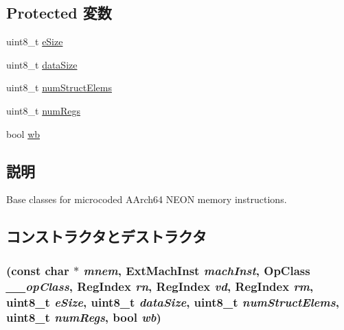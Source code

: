 \subsection*{Protected 変数}
\begin{DoxyCompactItemize}
\item 
uint8\_\-t \hyperlink{classArmISA_1_1VldMultOp64_aac129ded07ba57383c5e2540f22c94ef}{eSize}
\item 
uint8\_\-t \hyperlink{classArmISA_1_1VldMultOp64_af13e629a2f79d14821c7b9246ef99e9f}{dataSize}
\item 
uint8\_\-t \hyperlink{classArmISA_1_1VldMultOp64_afb0be420b537599a5b86558127502040}{numStructElems}
\item 
uint8\_\-t \hyperlink{classArmISA_1_1VldMultOp64_a7a5268882c913c394a8ad4d988eb94e6}{numRegs}
\item 
bool \hyperlink{classArmISA_1_1VldMultOp64_a93541ed16711b2c9c53cf093b675d90b}{wb}
\end{DoxyCompactItemize}


\subsection{説明}
Base classes for microcoded AArch64 NEON memory instructions. 

\subsection{コンストラクタとデストラクタ}
\hypertarget{classArmISA_1_1VldMultOp64_a355647a38deb45ea21e749e81606300b}{
\subsubsection[{VldMultOp64}]{ (const char $\ast$ {\em mnem}, \/  {\bf ExtMachInst} {\em machInst}, \/  OpClass {\em \_\-\_\-opClass}, \/  {\bf RegIndex} {\em rn}, \/  {\bf RegIndex} {\em vd}, \/  {\bf RegIndex} {\em rm}, \/  uint8\_\-t {\em eSize}, \/  uint8\_\-t {\em dataSize}, \/  uint8\_\-t {\em numStructElems}, \/  uint8\_\-t {\em numRegs}, \/  bool {\em wb})}}
\label{classArmISA_1_1VldMultOp64_a355647a38deb45ea21e749e81606300b}



